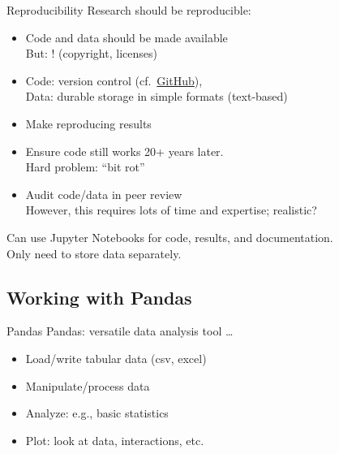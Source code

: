 \documentclass[aspectratio=169,usenames,dvipsnames]{beamer}
\begin{document}
\begin{frame}{Reproducibility}
    Research should be reproducible:

    \begin{itemize}
        \item Code and data should be made available \\
            But: ! (copyright, licenses)
        \item Code: version control (cf.\ \href{http://www.github.com}{GitHub}),\\
            Data: durable storage in simple formats (text-based)
        \item Make reproducing results 
        \item Ensure code still works 20+ years later. \\
            Hard problem: ``bit rot''
        \item Audit code/data in peer review \\
            However, this requires lots of time and expertise; realistic?
    \end{itemize}

    Can use Jupyter Notebooks for code, results, and documentation. \\
    Only need to store data separately.
\end{frame}


\subsection{Working with Pandas}
\frame{\tableofcontents[currentsubsection]}

\begin{frame}{Pandas}
    Pandas: versatile data analysis tool \dots

    \begin{itemize}
        \item Load/write tabular data (csv, excel)
        \item Manipulate/process data
        \item Analyze: e.g., basic statistics
        \item Plot: look at data, interactions, etc.
    \end{itemize}
\end{frame}
\end{document}

